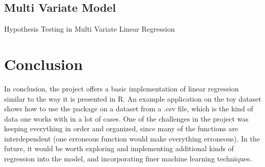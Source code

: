 \documentclass[11pt,a4paper]{article}
\begin{document}
\subsection{Multi Variate Model}
\begin{table}[H]
    \centering
    \caption{Hypothesis Testing in Multi Variate Linear Regression}
\end{table}

\newpage
\section{Conclusion}
In conclusion, the project offers a basic implementation of linear regression
similar to the way it is presented in R. An example application on the toy
dataset shows how to use the package on a dataset from a .csv file, which is
the kind of data one works with in a lot of cases. One of the challenges in the
project was keeping everything in order and organized, since many of the
functions are interdependent (one erroneous function would make everything
erroneous). In the future, it would be worth exploring and implementing
additional kinds of regression into the model, and incorporating finer machine
learning techniques.
\end{document}
